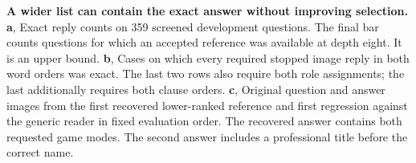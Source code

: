 \textbf{A wider list can contain the exact answer without improving selection.}
\textbf{a}, Exact reply counts on 359 screened development questions. The final bar counts questions for which an accepted reference was available at depth eight. It is an upper bound.
\textbf{b}, Cases on which every required stopped image reply in both word orders was exact. The last two rows also require both role assignments; the last additionally requires both clause orders.
\textbf{c}, Original question and answer images from the first recovered lower-ranked reference and first regression against the generic reader in fixed evaluation order. The recovered answer contains both requested game modes. The second answer includes a professional title before the correct name.

